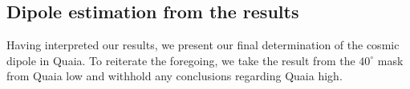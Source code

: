 \documentclass[fleqn,usenatbib]{mnras}
\begin{document}
    
    
    
    \subsection{Dipole estimation from the results}
        Having interpreted our results, we present our final determination of the cosmic dipole in Quaia.
        To reiterate the foregoing, we take the result from the $40^\circ$ mask from Quaia low
        and withhold any conclusions regarding Quaia high.
    
\end{document}
